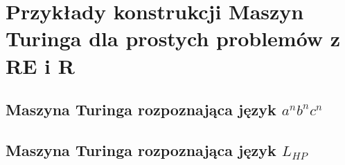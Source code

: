 \section{Przykłady konstrukcji Maszyn Turinga dla prostych problemów z RE i R}

\subsection{Maszyna Turinga rozpoznająca język \texorpdfstring{\(a^nb^nc^n\)}{aenbeenceen}}

\subsection{Maszyna Turinga rozpoznająca język \texorpdfstring{\(L_{HP}\)}{stopu}}